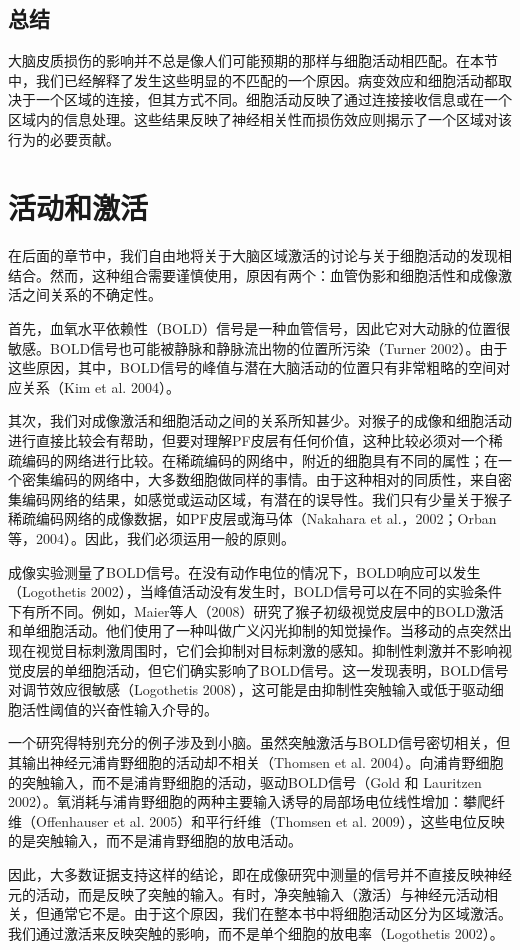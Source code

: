 \subsection{总结}
大脑皮质损伤的影响并不总是像人们可能预期的那样与细胞活动相匹配。在本节中，我们已经解释了发生这些明显的不匹配的一个原因。病变效应和细胞活动都取决于一个区域的连接，但其方式不同。细胞活动反映了通过连接接收信息或在一个区域内的信息处理。这些结果反映了神经相关性而损伤效应则揭示了一个区域对该行为的必要贡献。


\section{活动和激活}
在后面的章节中，我们自由地将关于大脑区域激活的讨论与关于细胞活动的发现相结合。然而，这种组合需要谨慎使用，原因有两个：血管伪影和细胞活性和成像激活之间关系的不确定性。
\par
首先，血氧水平依赖性（BOLD）信号是一种血管信号，因此它对大动脉的位置很敏感。BOLD信号也可能被静脉和静脉流出物的位置所污染（Turner 2002）。由于这些原因，其中，BOLD信号的峰值与潜在大脑活动的位置只有非常粗略的空间对应关系（Kim et al. 2004）。
\par
其次，我们对成像激活和细胞活动之间的关系所知甚少。对猴子的成像和细胞活动进行直接比较会有帮助，但要对理解PF皮层有任何价值，这种比较必须对一个稀疏编码的网络进行比较。在稀疏编码的网络中，附近的细胞具有不同的属性；在一个密集编码的网络中，大多数细胞做同样的事情。由于这种相对的同质性，来自密集编码网络的结果，如感觉或运动区域，有潜在的误导性。我们只有少量关于猴子稀疏编码网络的成像数据，如PF皮层或海马体（Nakahara et al.，2002；Orban等，2004）。因此，我们必须运用一般的原则。
\par
成像实验测量了BOLD信号。在没有动作电位的情况下，BOLD响应可以发生（Logothetis 2002），当峰值活动没有发生时，BOLD信号可以在不同的实验条件下有所不同。例如，Maier等人（2008）研究了猴子初级视觉皮层中的BOLD激活和单细胞活动。他们使用了一种叫做广义闪光抑制的知觉操作。当移动的点突然出现在视觉目标刺激周围时，它们会抑制对目标刺激的感知。抑制性刺激并不影响视觉皮层的单细胞活动，但它们确实影响了BOLD信号。这一发现表明，BOLD信号对调节效应很敏感（Logothetis 2008），这可能是由抑制性突触输入或低于驱动细胞活性阈值的兴奋性输入介导的。
\par
一个研究得特别充分的例子涉及到小脑。虽然突触激活与BOLD信号密切相关，但其输出神经元浦肯野细胞的活动却不相关（Thomsen et al. 2004）。向浦肯野细胞的突触输入，而不是浦肯野细胞的活动，驱动BOLD信号（Gold 和 Lauritzen 2002）。氧消耗与浦肯野细胞的两种主要输入诱导的局部场电位线性增加：攀爬纤维（Offenhauser et al. 2005）和平行纤维（Thomsen et al. 2009），这些电位反映的是突触输入，而不是浦肯野细胞的放电活动。
\par
因此，大多数证据支持这样的结论，即在成像研究中测量的信号并不直接反映神经元的活动，而是反映了突触的输入。有时，净突触输入（激活）与神经元活动相关，但通常它不是。由于这个原因，我们在整本书中将细胞活动区分为区域激活。我们通过激活来反映突触的影响，而不是单个细胞的放电率（Logothetis 2002）。

